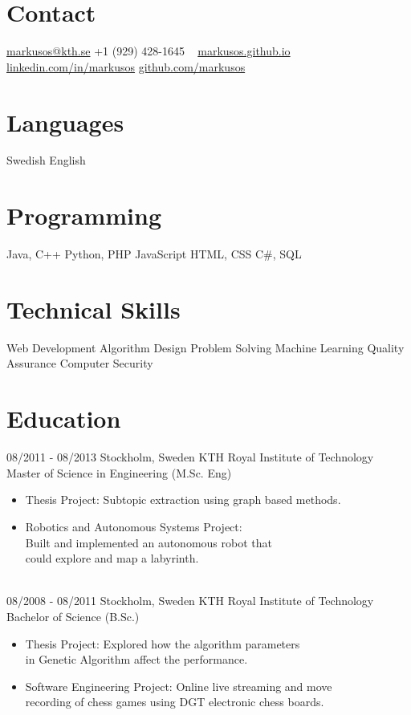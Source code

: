 \documentclass{markusos-cv}
\begin{document}


\begin{aside}
\section{Contact}
\href{mailto:markusos@kth.se}{markusos@kth.se}
+1 (929) 428-1645
~
\href{http://markusos.github.io/}{markusos.github.io}
\href{http://www.linkedin.com/in/markusos}{linkedin.com/in/markusos}
\href{https://github.com/markusos}{github.com/markusos}
\section{Languages}
Swedish
English
\section{Programming}
Java, C++
Python, PHP
JavaScript
HTML, CSS
C\#, SQL
\section{Technical Skills}
Web Development
Algorithm Design
Problem Solving
Machine Learning
Quality Assurance
Computer Security
\end{aside}


\section{Education}

\begin{entrylist}
\entry
{08/2011 - 08/2013}
{Stockholm, Sweden}
{KTH Royal Institute of Technology}
{Master of Science in Engineering (M.Sc. Eng)}
{
\begin{itemize}
\item Thesis Project: Subtopic extraction using graph based methods.
\item Robotics and Autonomous Systems Project:\\ Built and implemented an autonomous robot that\\ could explore and map a labyrinth.
\end{itemize}
}
\\%
\entry
{08/2008 - 08/2011}
{Stockholm, Sweden}
{KTH Royal Institute of Technology}
{Bachelor of Science (B.Sc.)}
{
\begin{itemize}
\item Thesis Project: Explored how the algorithm parameters\\ in Genetic Algorithm affect the performance.
\item Software Engineering Project: Online live streaming and move\\ recording of chess games using DGT electronic chess boards. 
\end{itemize}
}

\end{entrylist}
\end{document}
